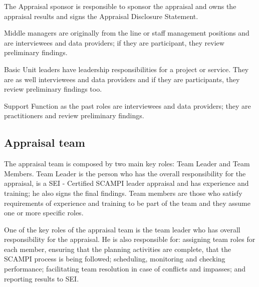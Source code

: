 The Appraisal sponsor is responsible to sponsor the appraisal and owns the appraisal results and signs the Appraisal Disclosure Statement.

Middle managers are originally from the line or staff management positions and are interviewees and data providers; if they are participant, they review preliminary findings.

Basic Unit leaders have leadership responsibilities for a project or service. They are as well interviewees and data providers and if they are participants, they review preliminary findings too.

Support Function as the past roles are interviewees and data providers; they are practitioners and review preliminary findings.

\subsection{Appraisal team}

The appraisal team is composed by two main key roles: Team Leader and Team Members.
Team Leader is the person who has the overall responsibility for the appraisal, is a SEI - Certified SCAMPI \citep{SCAMPITeam2013} leader appraisal and has experience and training; he also signs the final findings.
Team members are those who satisfy requirements of  experience and training to be part of the team and they assume one or more specific roles.

One of the key roles of the appraisal team is the team leader who has overall responsibility for the appraisal. He is also responsible for: assigning team roles for each member, ensuring that the planning activities are complete, that the SCAMPI process is being followed; scheduling, monitoring and checking performance; facilitating team resolution in case of conflicts and impasses; and reporting results to SEI.

